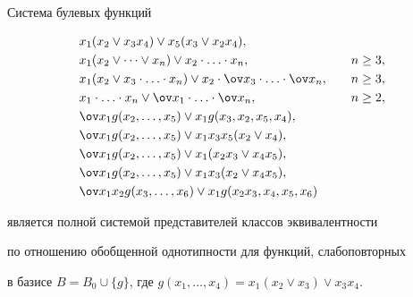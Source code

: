 \begin{thmnonum} 


Система булевых функций 


\begin{alignat*}{2} 


& x_1(x_2\vee x_3x_4)\vee x_5(x_3\vee x_2x_4), &\quad & \ \\ 


% 


&x_1(x_2\vee\dotsb\vee x_n)\vee x_2\cdot\dotsc\cdot x_n, 


&\quad & n\ge3, \\ 


% 


&x_1(x_2\vee x_3\cdot\dotsc\cdot x_n)\vee x_2\cdot\ov x_3\cdot 


\dotsc \cdot\ov x_n, &\quad & n\ge 3, \\ 


% 


&x_1\cdot\dotsc\cdot x_n\vee \ov x_1\cdot\dotsc\cdot\ov x_n, 


&\quad & n\ge 2, \\ 


% 


&\ov x_1g(x_2,\dotsc,x_5)\vee x_1g(x_3,x_2,x_5,x_4), &\quad & \ \\ 


% 


&\ov x_1g(x_2,\dotsc,x_5)\vee x_1x_3x_5(x_2\vee x_4), &\quad & \ \\ 


% 


&\ov x_1g(x_2,\dotsc,x_5)\vee x_1(x_2x_3\vee x_4x_5), &\quad & \ \\ 


% 


&\ov x_1g(x_2,\dotsc,x_5)\vee x_1x_3(x_2\vee x_4x_5), &\quad & \ \\ 


% 


&\ov x_1x_2g(x_3,\dotsc,x_6)\vee x_1g 


(x_2x_3,x_4,x_5,x_6) &\quad & \ 


\end{alignat*} 


является полной системой представителей классов эквивалентности 


по отношению обобщенной однотипности для функций, слабоповторных 


в базисе $B=B_0\cup\{g\}$, где $g(x_1,\dotsc,x_4)=x_1(x_2\vee x_3)\vee 


x_3x_4$. 


\end{thmnonum} 


